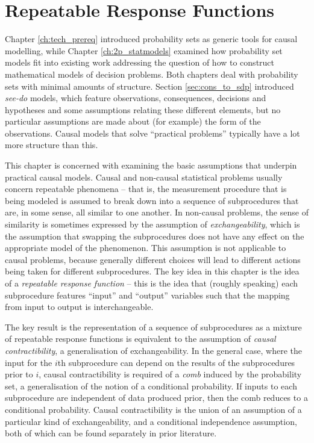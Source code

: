 
\chapter{Repeatable Response Functions}\label{ch:evaluating_decisions}

Chapter \ref{ch:tech_prereq} introduced probability sets as generic tools for causal modelling, while Chapter \ref{ch:2p_statmodels} examined how probability set models fit into existing work addressing the question of how to construct mathematical models of decision problems. Both chapters deal with probability sets with minimal amounts of structure. Section \ref{sec:cons_to_sdp} introduced \emph{see-do} models, which feature observations, consequences, decisions and hypotheses and some assumptions relating these different elements, but no particular assumptions are made about (for example) the form of the observations. Causal models that solve ``practical problems'' typically have a lot more structure than this.

This chapter is concerned with examining the basic assumptions that underpin practical causal models. Causal and non-causal statistical problems usually concern repeatable phenomena -- that is, the measurement procedure that is being modeled is assumed to break down into a sequence of subprocedures that are, in some sense, all similar to one another. In non-causal problems, the sense of similarity is sometimes expressed by the assumption of \emph{exchangeability}, which is the assumption that swapping the subprocedures does not have any effect on the appropriate model of the phenomenon. This assumption is not applicable to causal problems, because generally different choices will lead to different actions being taken for different subprocedures. The key idea in this chapter is the idea of a \emph{repeatable response function} -- this is the idea that (roughly speaking) each subprocedure features ``input'' and ``output'' variables such that the mapping from input to output is interchangeable.

The key result is the representation of a sequence of subprocedures as a mixture of repeatable response functions is equivalent to the assumption of \emph{causal contractibility}, a generalisation of exchangeability. In the general case, where the input for the $i$th subprocedure can depend on the results of the subprocedures prior to $i$, causal contractibility is required of a \emph{comb} induced by the probability set, a generalisation of the notion of a conditional probability. If inputs to each subprocedure are independent of data produced prior, then the comb reduces to a conditional probability. Causal contractibility is the union of an assumption of a particular kind of exchangeability, and a conditional independence assumption, both of which can be found separately in prior literature.

